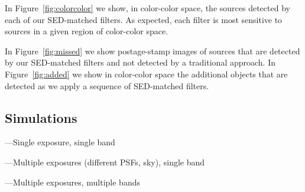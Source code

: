 \documentclass[letterpaper,preprint]{aastex}
\newcommand{\fig}{Figure}
\newcommand{\figref}[1]{\mbox{\fig~\ref{#1}}}
\begin{document}
In \figref{fig:colorcolor} we show, in color-color space, the sources
detected by each of our SED-matched filters.  As expected, each filter
is most sensitive to sources in a given region of color-color space.


In \figref{fig:missed} we show postage-stamp images of sources that
are detected by our SED-matched filters and not detected by a
traditional approach.  In \figref{fig:added} we show in color-color
space the additional objects that are detected as we apply a sequence
of SED-matched filters.



\subsection{Simulations}

---Single exposure, single band

---Multiple exposures (different PSFs, sky), single band

---Multiple exposures, multiple bands
\end{document}

